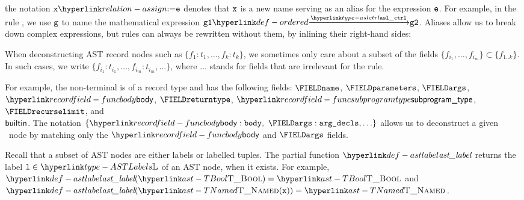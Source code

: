\begin{description}
\hypertarget{relation-assign}{}
\item[Definition / ``Define as'':] the notation $\vx \eqdef \ve$ denotes that $\texttt{x}$ is a new name serving as an alias for the expression $\texttt{e}$.
For example, in the rule , we use $\texttt{g}$ to name the mathematical expression
$\ordered{\vgone}{\aslctrl}{\vgtwo}$.
Aliases allow us to break down complex expressions, but rules can always be rewritten without them,
by inlining their right-hand sides:
\begin{mathpar}
\end{mathpar}
\end{description}

When deconstructing AST record nodes such as $\{f_1:t_1,\ldots,f_k:t_k\}$,
we sometimes only care about a subset of the fields $\{f_{i_1},\ldots,f_{i_m}\} \subset \{f_{1..k}\}$.
In such cases, we write $\{f_{i_1}:t_{i_1},\ldots,f_{i_m}:t_{i_m},\ldots\}$,
where $\ldots$ stands for fields that are irrelevant for the rule.

For example, the \func{} non-terminal is
of a record type and has the following fields:
$\FIELDname$, $\FIELDparameters$, $\FIELDargs$, $\funcbody$, $\FIELDreturntype$, $\funcsubprogramtype$,
$\FIELDrecurselimit$, and \\
$\textsf{builtin}$.
The notation $\{ \funcbody:\vbody,\ \FIELDargs:\vargdecls, \ldots \}$
allows us to deconstruct a given \func\ node by matching only the $\funcbody$ and $\FIELDargs$ fields.

Recall that a subset of AST nodes are either labels or labelled tuples.
The partial function $\astlabel$ returns the label $\vl\in\ASTLabels$ of an AST node, when it exists.
For example, $\astlabel(\TBool) = \TBool$ and $\astlabel(\TNamed(\vx)) = \TNamed$.

